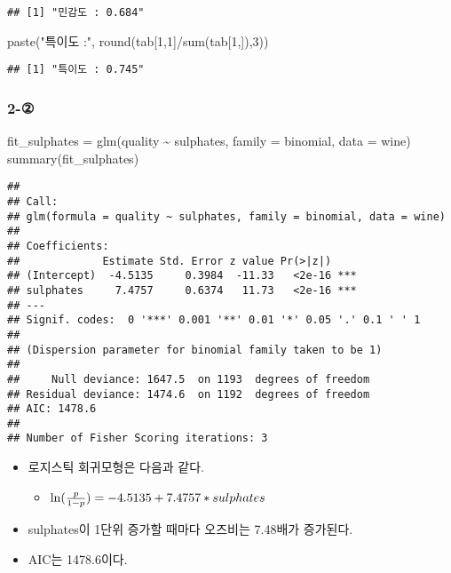 \documentclass[
]{article}
\newenvironment{Shaded}{\begin{snugshade}}{\end{snugshade}}
\newcommand{\AttributeTok}[1]{\textcolor[rgb]{0.77,0.63,0.00}{#1}}
\newcommand{\DecValTok}[1]{\textcolor[rgb]{0.00,0.00,0.81}{#1}}
\newcommand{\FunctionTok}[1]{\textcolor[rgb]{0.00,0.00,0.00}{#1}}
\newcommand{\NormalTok}[1]{#1}
\newcommand{\OtherTok}[1]{\textcolor[rgb]{0.56,0.35,0.01}{#1}}
\newcommand{\SpecialCharTok}[1]{\textcolor[rgb]{0.00,0.00,0.00}{#1}}
\newcommand{\StringTok}[1]{\textcolor[rgb]{0.31,0.60,0.02}{#1}}
\providecommand{\tightlist}{%
  \setlength{\itemsep}{0pt}\setlength{\parskip}{0pt}}
\begin{document}
\begin{verbatim}
## [1] "민감도 : 0.684"
\end{verbatim}

\begin{Shaded}
\begin{Highlighting}[]
\FunctionTok{paste}\NormalTok{(}\StringTok{"특이도 :"}\NormalTok{, }\FunctionTok{round}\NormalTok{(tab[}\DecValTok{1}\NormalTok{,}\DecValTok{1}\NormalTok{]}\SpecialCharTok{/}\FunctionTok{sum}\NormalTok{(tab[}\DecValTok{1}\NormalTok{,]),}\DecValTok{3}\NormalTok{))}
\end{Highlighting}
\end{Shaded}

\begin{verbatim}
## [1] "특이도 : 0.745"
\end{verbatim}

\hypertarget{section-3}{%
\subsubsection{2-②}\label{section-3}}

\begin{Shaded}
\begin{Highlighting}[]
\NormalTok{fit\_sulphates }\OtherTok{=} \FunctionTok{glm}\NormalTok{(quality }\SpecialCharTok{\textasciitilde{}}\NormalTok{ sulphates, }\AttributeTok{family =}\NormalTok{ binomial, }\AttributeTok{data =}\NormalTok{ wine)}
\FunctionTok{summary}\NormalTok{(fit\_sulphates)}
\end{Highlighting}
\end{Shaded}

\begin{verbatim}
## 
## Call:
## glm(formula = quality ~ sulphates, family = binomial, data = wine)
## 
## Coefficients:
##             Estimate Std. Error z value Pr(>|z|)    
## (Intercept)  -4.5135     0.3984  -11.33   <2e-16 ***
## sulphates     7.4757     0.6374   11.73   <2e-16 ***
## ---
## Signif. codes:  0 '***' 0.001 '**' 0.01 '*' 0.05 '.' 0.1 ' ' 1
## 
## (Dispersion parameter for binomial family taken to be 1)
## 
##     Null deviance: 1647.5  on 1193  degrees of freedom
## Residual deviance: 1474.6  on 1192  degrees of freedom
## AIC: 1478.6
## 
## Number of Fisher Scoring iterations: 3
\end{verbatim}

\begin{itemize}
\tightlist
\item
  로지스틱 회귀모형은 다음과 같다.

  \begin{itemize}
  \tightlist
  \item
    \(\ln({p \over 1-p}) = -4.5135 + 7.4757 * sulphates\)
  \end{itemize}
\item
  sulphates이 1단위 증가할 때마다 오즈비는 7.48배가 증가된다.
\item
  AIC는 1478.6이다.
\end{itemize}
\end{document}
